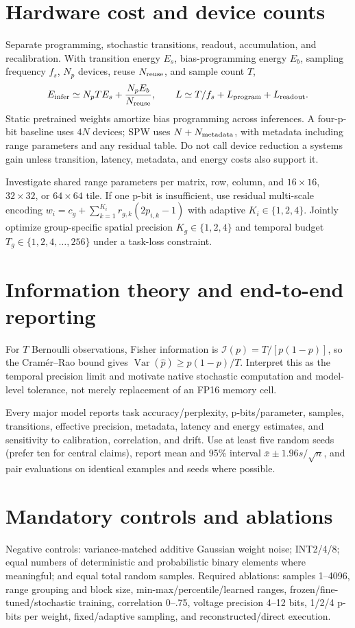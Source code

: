\documentclass[11pt]{article}
\newcommand{\Var}{\operatorname{Var}}
\begin{document}
\section{Hardware cost and device counts}
Separate programming, stochastic transitions, readout, accumulation, and recalibration.
With transition energy $E_s$, bias-programming energy $E_b$, sampling frequency $f_s$,
$N_p$ devices, reuse $N_{\rm reuse}$, and sample count $T$,
\begin{equation}
 E_{\rm infer}\simeq N_pTE_s+\frac{N_pE_b}{N_{\rm reuse}},\qquad
 L\simeq T/f_s+L_{\rm program}+L_{\rm readout}.
\end{equation}
Static pretrained weights amortize bias programming across inferences. A four-p-bit
baseline uses $4N$ devices; SPW uses $N+N_{\rm metadata}$, with metadata including
range parameters and any residual table. Do not call device reduction a systems gain
unless transition, latency, metadata, and energy costs also support it.

Investigate shared range parameters per matrix, row, column, and $16\times16$,
$32\times32$, or $64\times64$ tile. If one p-bit is insufficient, use residual
multi-scale encoding $w_i=c_g+\sum_{k=1}^{K_i}r_{g,k}(2p_{i,k}-1)$ with adaptive
$K_i\in\{1,2,4\}$. Jointly optimize group-specific spatial precision
$K_g\in\{1,2,4\}$ and temporal budget $T_g\in\{1,2,4,\ldots,256\}$ under a task-loss
constraint.

\section{Information theory and end-to-end reporting}
For $T$ Bernoulli observations, Fisher information is
$\mathcal I(p)=T/[p(1-p)]$, so the Cram\'er--Rao bound gives
$\Var(\hat p)\ge p(1-p)/T$. Interpret this as the temporal precision limit and motivate
native stochastic computation and model-level tolerance, not merely replacement of an
FP16 memory cell.

Every major model reports task accuracy/perplexity, p-bits/parameter, samples, transitions,
effective precision, metadata, latency and energy estimates, and sensitivity to
calibration, correlation, and drift. Use at least five random seeds (prefer ten for
central claims), report mean and 95\% interval $\bar x\pm1.96s/\sqrt n$, and pair
evaluations on identical examples and seeds where possible.

\section{Mandatory controls and ablations}
Negative controls: variance-matched additive Gaussian weight noise; INT2/4/8; equal
numbers of deterministic and probabilistic binary elements where meaningful; and equal
total random samples. Required ablations: samples 1--4096, range grouping and block
size, min-max/percentile/learned ranges, frozen/fine-tuned/stochastic training,
correlation 0--.75, voltage precision 4--12 bits, 1/2/4 p-bits per weight,
fixed/adaptive sampling, and reconstructed/direct execution.
\end{document}

